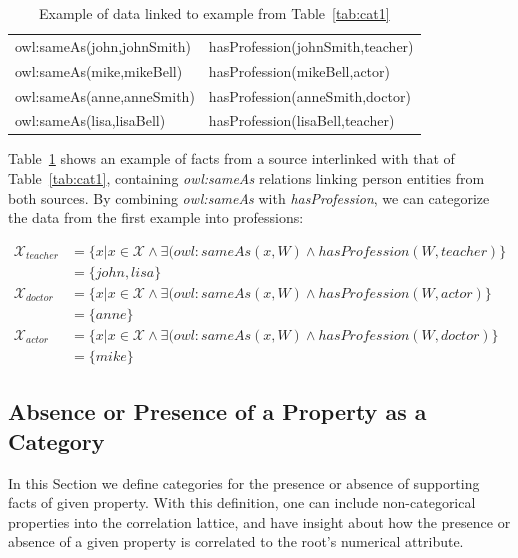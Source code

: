 \begin{table}[h!]
 \begin{center}
 \caption{Example of data linked to example from Table~\ref{tab:cat1}}
  \begin{tabular}{l l}
    \toprule
    owl:sameAs(john,johnSmith)& hasProfession(johnSmith,teacher)  \\
    owl:sameAs(mike,mikeBell) & hasProfession(mikeBell,actor) 	 \\
    owl:sameAs(anne,anneSmith)& hasProfession(anneSmith,doctor)	 \\
    owl:sameAs(lisa,lisaBell) & hasProfession(lisaBell,teacher)  \\
    \bottomrule
  \end{tabular}
 \label{tab:cat2}
 \end{center}
\end{table}

Table~\ref{tab:cat2} shows an example of facts from a source interlinked with that of Table~\ref{tab:cat1},
containing \emph{owl:sameAs} relations linking person entities from both sources. By combining \emph{owl:sameAs} with
\emph{hasProfession}, we can categorize the data from the first example into professions:

\begin{align*}
\mathcal{X}_{teacher}&=\{ x|x \in \mathcal{X} \wedge \exists (owl:sameAs(x,W) \wedge hasProfession(W,teacher)\} \\
  &=\{john,lisa\} \\
\mathcal{X}_{doctor}&=\{ x|x \in \mathcal{X} \wedge \exists (owl:sameAs(x,W) \wedge hasProfession(W,actor)\} \\
  &=\{anne\} \\
\mathcal{X}_{actor}&=\{ x|x \in \mathcal{X} \wedge \exists (owl:sameAs(x,W) \wedge hasProfession(W,doctor)\} \\
  &=\{mike\}
\end{align*}


\subsection{Absence or Presence of a Property as a Category}

In this Section we define categories for the presence or absence of supporting facts of given property. With
this definition, one can include non-categorical properties into the correlation lattice, and have insight about how
the presence or absence of a given property is correlated to the root's numerical attribute.


